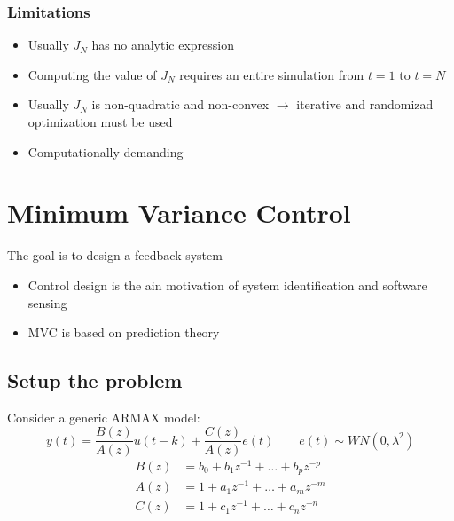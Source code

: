 \documentclass{report}
\begin{document}
\subsection{Limitations}
\begin{itemize}
\item Usually $J_N$ has no analytic expression
\item Computing the value of $J_N$ requires an entire simulation from $t=1$ to $t=N$
\item Usually $J_N$ is non-quadratic and non-convex $\rightarrow$ iterative and randomizad optimization must be used
\item Computationally demanding
\end{itemize}
\begin{center}
\end{center}

\chapter{Minimum Variance Control}
The goal is to design a feedback system
\begin{itemize}
\item Control design is the ain motivation of system identification and software sensing
\item MVC is based on prediction theory
\end{itemize}
\section{Setup the problem}
Consider a generic ARMAX model:
\[
y(t)=\frac{B(z)}{A(z)}u(t-k)
+\frac{C(z)}{A(z)}e(t)
\qquad
e(t)\sim WN(0,\lambda^2)
\]
\begin{align*}
B(z)&=b_0+b_1z^{-1}+\dots+b_pz^{-p}\\
A(z)&=1+a_1z^{-1}+\dots+a_mz^{-m}\\
C(z)&=1+c_1z^{-1}+\dots+c_nz^{-n}
\end{align*}
\end{document}
